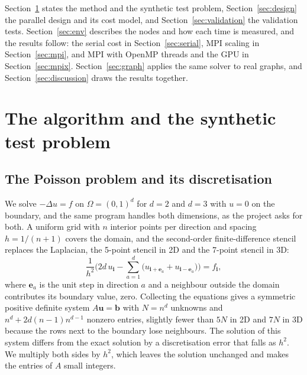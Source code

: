 \documentclass[10pt,a4paper]{article}
\newcommand{\req}[1]{}
\newcounter{algo}
\begin{document}
Section~\ref{sec:algorithm} states the method and the synthetic test problem, Section~\ref{sec:design} the parallel
design and its cost model, and Section~\ref{sec:validation} the validation tests. Section~\ref{sec:env} describes the
nodes and how each time is measured, and the results follow: the serial cost in Section~\ref{sec:serial}, MPI scaling
in Section~\ref{sec:mpi}, and MPI with OpenMP threads and the GPU in Section~\ref{sec:mpix}.
Section~\ref{sec:graph} applies the same solver to real graphs, and Section~\ref{sec:discussion} draws the results
together.

\section{The algorithm and the synthetic test problem}\label{sec:algorithm}
\req{E1}\req{E12}\req{E11}\req{E13}
\subsection{The Poisson problem and its discretisation}
We solve $-\Delta u = f$ on $\Omega=(0,1)^d$ for $d=2$ and $d=3$ with $u=0$ on the boundary, and the same program
handles both dimensions, as the project asks for both. A uniform grid with $n$ interior points per direction and
spacing $h=1/(n+1)$ covers the domain, and the second-order finite-difference stencil replaces the Laplacian, the
5-point stencil in 2D and the 7-point stencil in 3D:
\begin{equation*}
\frac{1}{h^2}\Big(2d\,u_{\mathbf{i}} - \sum_{a=1}^{d}\big(u_{\mathbf{i}+\mathbf{e}_a} + u_{\mathbf{i}-\mathbf{e}_a}\big)\Big)
= f_{\mathbf{i}},
\end{equation*}
where $\mathbf{e}_a$ is the unit step in direction $a$ and a neighbour outside the domain contributes its boundary
value, zero. Collecting the equations gives a symmetric positive definite system $A\mathbf{u}=\mathbf{b}$ with $N=n^d$
unknowns and $n^d + 2d(n-1)n^{d-1}$ nonzero entries, slightly fewer than $5N$ in 2D and $7N$ in 3D because the rows
next to the boundary lose neighbours. The solution of this system differs from the exact solution by a discretisation
error that falls as $h^2$. We multiply both sides by $h^2$, which leaves the solution unchanged and makes the entries
of $A$ small integers.
\end{document}

